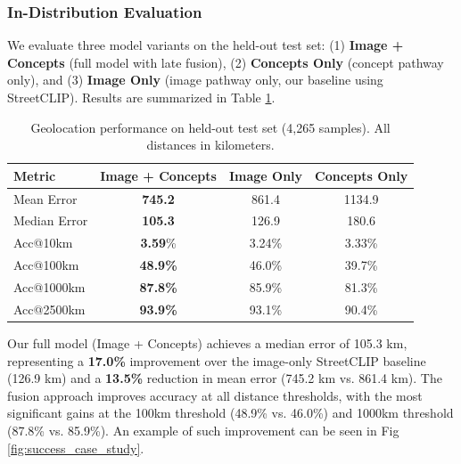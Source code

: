 \documentclass{article}
\begin{document}
\subsubsection{In-Distribution Evaluation}

We evaluate three model variants on the held-out test set: (1) \textbf{Image + Concepts} (full model with late fusion), (2) \textbf{Concepts Only} (concept pathway only), and (3) \textbf{Image Only} (image pathway only, our baseline using StreetCLIP). Results are summarized in Table \ref{tab:geolocation_results}.

\begin{table}[h]
\centering
\caption{Geolocation performance on held-out test set (4,265 samples). All distances in kilometers.}
\label{tab:geolocation_results}
\begin{tabular}{lccc}
\toprule
\textbf{Metric} & \textbf{Image + Concepts} & \textbf{Image Only} & \textbf{Concepts Only} \\
\midrule
Mean Error & \textbf{745.2} & 861.4 & 1134.9 \\
Median Error & \textbf{105.3} & 126.9 & 180.6 \\
Acc@10km & \textbf{3.59}\% & 3.24\% & 3.33\% \\
Acc@100km & \textbf{48.9\%} & 46.0\% & 39.7\% \\
Acc@1000km & \textbf{87.8\%} & 85.9\% & 81.3\% \\
Acc@2500km & \textbf{93.9\%} & 93.1\% & 90.4\% \\
\bottomrule
\end{tabular}
\end{table}

Our full model (Image + Concepts) achieves a median error of 105.3 km, representing a \textbf{17.0\%} improvement over the image-only StreetCLIP baseline (126.9 km) and a \textbf{13.5\%} reduction in mean error (745.2 km vs. 861.4 km). The fusion approach improves accuracy at all distance thresholds, with the most significant gains at the 100km threshold (48.9\% vs. 46.0\%) and 1000km threshold (87.8\% vs. 85.9\%). An example of such improvement can be seen in Fig \ref{fig:success_case_study}.
\end{document}
